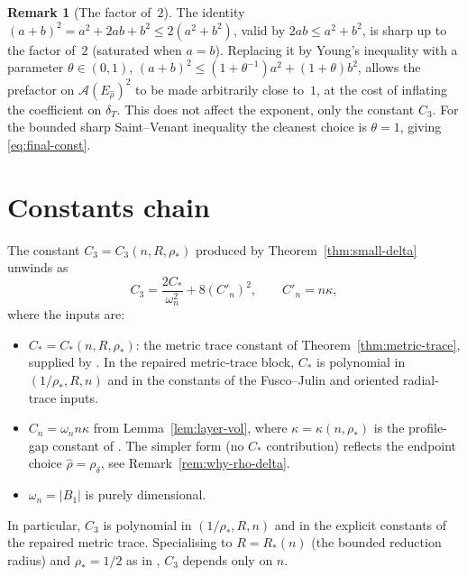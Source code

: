 \documentclass[11pt]{article}
\theoremstyle{definition}
\newtheorem{remark}[theorem]{Remark}
\newcommand{\Fr}{\mathcal{A}}
\newcommand{\rstar}{\rho_{*}}
\newcommand{\rhad}{\widehat\rho}
\begin{document}
\begin{remark}[The factor of~$2$]\label{rem:factor-2}
The identity $(a+b)^2=a^2+2ab+b^2\le 2(a^2+b^2)$, valid by
$2ab\le a^2+b^2$, is sharp up to the factor of~$2$ (saturated when
$a=b$). Replacing it by Young's inequality with a parameter
$\theta\in(0,1)$, $(a+b)^2\le (1+\theta^{-1})a^2+(1+\theta)b^2$,
allows the prefactor on $\Fr(E_{\rhad})^2$ to be made arbitrarily
close to~$1$, at the cost of inflating the coefficient on
$\delta_T$. This does not affect the exponent, only the constant
$C_3$. For the bounded sharp Saint--Venant inequality the cleanest
choice is $\theta=1$, giving \eqref{eq:final-const}.
\end{remark}

\section{Constants chain}\label{sec:constants}

The constant $C_3=C_3(n,R,\rstar)$ produced by
Theorem~\ref{thm:small-delta} unwinds as
\begin{equation}\label{eq:C3-chain}
C_3=\frac{2C_*}{\omega_n^{2}}+8(C'_n)^{2},
\qquad C'_n=n\kappa,
\end{equation}
where the inputs are:

\begin{itemize}
\item $C_*=C_*(n,R,\rstar)$: the metric trace constant of
Theorem~\ref{thm:metric-trace}, supplied by
\cite[Theorem on weighted metric trace]{WeightedMetricTrace}. In the
repaired metric-trace block, $C_*$ is polynomial in
$(1/\rstar, R, n)$ and in the constants of the Fusco--Julin and
oriented radial-trace inputs.

\item $C_n=\omega_n n\kappa$ from Lemma~\ref{lem:layer-vol},
where $\kappa=\kappa(n,\rstar)$ is the profile-gap constant of
\cite{LevelSetIdentity}.  The simpler form (no $C_*$ contribution)
reflects the endpoint choice $\rhad=\rho_\delta$, see
Remark~\ref{rem:why-rho-delta}.

\item $\omega_n=|B_1|$ is purely dimensional.
\end{itemize}

In particular, $C_3$ is polynomial in $(1/\rstar, R, n)$ and in the
explicit constants of the repaired metric trace. Specialising to
$R=R_*(n)$ (the bounded reduction radius) and $\rstar=1/2$ as in
\cite{WeightedMetricTrace}, $C_3$ depends only on $n$.
\end{document}
